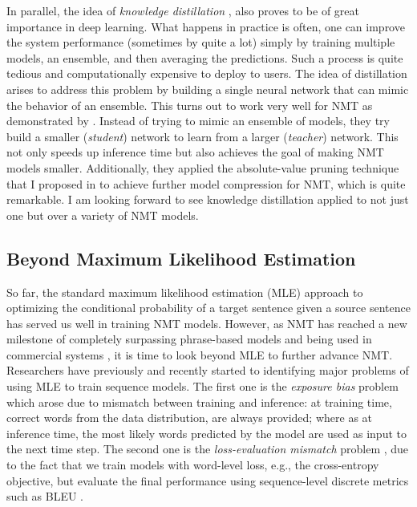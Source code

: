 In parallel, the idea of {\it knowledge distillation} \cite{hinton2015distilling}, also proves to be of great importance in deep learning. What happens in practice is often, one can improve the system performance (sometimes by quite a lot) simply by training multiple models, an ensemble, and then averaging the predictions. Such a process is quite tedious and computationally expensive to deploy to users. The idea of distillation arises to address this problem by building a single neural network that can mimic the behavior of an ensemble. This turns out to work very well for NMT as demonstrated by . Instead of trying to mimic an ensemble of models, they try build a smaller ({\it student}) network to learn from a larger ({\it teacher}) network. This not only speeds up inference time but also achieves the goal of making NMT models smaller. Additionally, they applied the absolute-value pruning technique that I proposed in  to achieve further model compression for NMT, which is quite remarkable. I am looking forward to see knowledge distillation applied to not just one but over a variety of NMT models.

\subsection{Beyond Maximum Likelihood Estimation}
So far, the standard maximum likelihood estimation (MLE) approach 
to optimizing the conditional probability of a target sentence given a source sentence 
has served us well in training NMT models. However, as NMT has reached a new milestone of completely surpassing phrase-based models and being used in commercial systems \cite{gnmt16,systran16}, it is time to look beyond MLE to further advance NMT. Researchers have previously and recently started to identifying major problems of using MLE to train sequence models. The first one is the {\it exposure bias} problem \cite{bengio15} which arose due to mismatch between training and inference: at training time, correct words from the data distribution, are always provided; where as at inference time, the most likely words predicted by the model are used as input to the next time step. The second one is the {\it loss-evaluation mismatch} problem \cite{ranzato16}, due to the fact that we train models with word-level loss, e.g., the cross-entropy objective, but evaluate the final performance using sequence-level discrete metrics such as BLEU \cite{Papineni02bleu}. 

